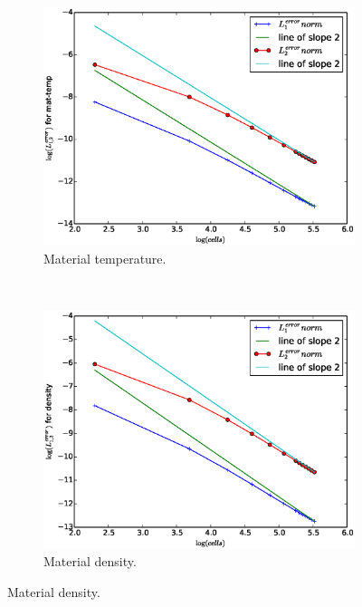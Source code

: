 \documentclass[times,doublespace]{fldauth}%
\begin{document}
\begin{figure}[H]
    \begin{subfigure}{0.5\textwidth}
    \centering
    \includegraphics[width=\linewidth]{figures/cst-xs/mach-1p05-mat-temp-convergence.eps}
    \caption{Material temperature.}\label{fig:mach-1p05-cst-xs-temp-conv}
    \end{subfigure}
    ~
    \begin{subfigure}{0.5\textwidth}
    \centering
    \includegraphics[width=\linewidth]{figures/cst-xs/mach-1p05-density-convergence.eps}
    \caption{Material density.}\label{fig:mach-1p05-cst-xs-density-conv}
    \end{subfigure}
    

\end{figure}
\end{document}
